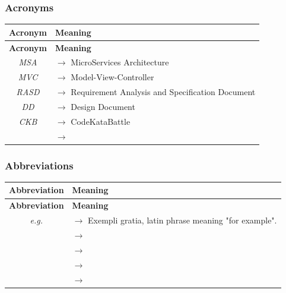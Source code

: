 \documentclass{article}
\begin{document}
{\subsubsection{Acronyms}
\begin{xltabular}{\textwidth}{ >{\raggedright\arraybackslash}c >{\raggedright\arraybackslash}X }
    \hline
    \textbf{Acronym} & \textbf{Meaning} \\
    \hline

    \endfirsthead

    \hline
    \textbf{Acronym} & \textbf{Meaning} \\
    \hline

    \endhead
    \endfoot
    \endlastfoot

    \textit{MSA} & $\rightarrow$ MicroServices Architecture\\
    \textit{MVC} & $\rightarrow$ Model-View-Controller\\
    \textit{RASD} & $\rightarrow$ Requirement Analysis and Specification Document\\
    \textit{DD} & $\rightarrow$ Design Document\\
    \textit{CKB} & $\rightarrow$ CodeKataBattle\\
    \textit{} & $\rightarrow$ \\
\end{xltabular}


\subsubsection{Abbreviations}
\begin{xltabular}{\textwidth}{ >{\raggedright\arraybackslash}c >{\raggedright\arraybackslash}X }
    \hline
    \textbf{Abbreviation} & \textbf{Meaning} \\
    \hline

    \endfirsthead

    \hline
    \textbf{Abbreviation} & \textbf{Meaning} \\
    \hline

    \endhead
    \endfoot
    \endlastfoot

    \textit{e.g.} & $\rightarrow$ Exempli gratia, latin phrase meaning "for example".
    \\
    \textit{} & $\rightarrow$
    \\
    \textit{} & $\rightarrow$
    \\
    \textit{} & $\rightarrow$
    \\
    \textit{} & $\rightarrow$
    \\
\end{xltabular}
}
\end{document}
